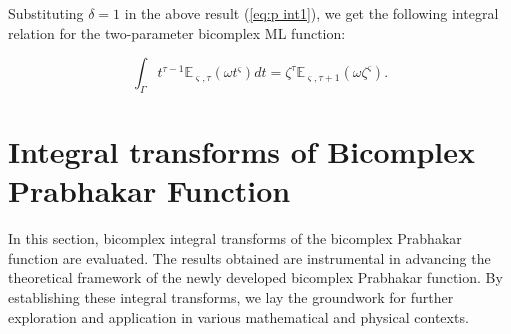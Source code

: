 \documentclass[a4paper,12pt]{article}
\newtheorem{definition}[theorem]{Definition}
\theoremstyle{remark}
\begin{document}

\noindent Substituting $ \delta=1$ in the above result (\ref{eq:p int1}), we get the following integral relation for the two-parameter bicomplex ML function:

\begin{equation}\label{eq:2pbmlir}
	\int_{\Gamma}t^{\tau-1}\mathbb{E}_{ \varsigma,\tau}(\omega t^ \varsigma)dt=\zeta^{\tau}\mathbb{E}_{ \varsigma,\tau+1}(\omega \zeta^ \varsigma).
	\end{equation}

\section{Integral transforms of Bicomplex Prabhakar Function }
In this section,  bicomplex integral transforms of the bicomplex Prabhakar function are evaluated. The results obtained are instrumental in advancing the theoretical framework of the newly developed bicomplex Prabhakar function. By establishing these integral transforms, we lay the groundwork for further exploration and application in various mathematical and physical contexts. 
   
\end{document}
